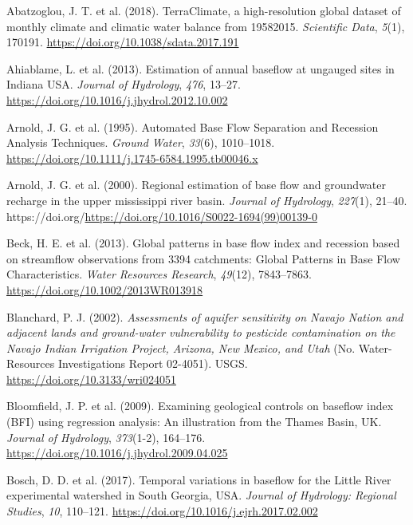 \documentclass[
]{agujournal2019}
\newlength{\cslhangindent}
\newenvironment{CSLReferences}[2] %
 {\begin{list}{}{%
  \setlength{\itemindent}{0pt}
  \setlength{\leftmargin}{0pt}
  \setlength{\parsep}{0pt}
  \ifodd #1
   \setlength{\leftmargin}{\cslhangindent}
   \setlength{\itemindent}{-1\cslhangindent}
  \fi
  \setlength{\itemsep}{#2\baselineskip}}}
 {\end{list}}
\begin{document}
\label{refs}
\begin{CSLReferences}{1}{0}
\vspace{1em}

Abatzoglou, J. T. et al. (2018). TerraClimate, a high-resolution global
dataset of monthly climate and climatic water balance from
1958{\textendash}2015. \emph{Scientific Data}, \emph{5}(1), 170191.
\url{https://doi.org/10.1038/sdata.2017.191}

Ahiablame, L. et al. (2013). Estimation of annual baseflow at ungauged
sites in Indiana USA. \emph{Journal of Hydrology}, \emph{476}, 13--27.
\url{https://doi.org/10.1016/j.jhydrol.2012.10.002}

Arnold, J. G. et al. (1995). Automated Base Flow Separation and
Recession Analysis Techniques. \emph{Ground Water}, \emph{33}(6),
1010--1018. \url{https://doi.org/10.1111/j.1745-6584.1995.tb00046.x}

Arnold, J. G. et al. (2000). Regional estimation of base flow and
groundwater recharge in the upper mississippi river basin. \emph{Journal
of Hydrology}, \emph{227}(1), 21--40.
https://doi.org/\url{https://doi.org/10.1016/S0022-1694(99)00139-0}

Beck, H. E. et al. (2013). Global patterns in base flow index and
recession based on streamflow observations from 3394 catchments: Global
Patterns in Base Flow Characteristics. \emph{Water Resources Research},
\emph{49}(12), 7843--7863. \url{https://doi.org/10.1002/2013WR013918}

Blanchard, P. J. (2002). \emph{Assessments of aquifer sensitivity on
{Navajo Nation} and adjacent lands and ground-water vulnerability to
pesticide contamination on the {Navajo Indian Irrigation Project},
{Arizona}, {New Mexico}, and {Utah}} (No. Water-Resources Investigations
Report 02-4051). {USGS}. \url{https://doi.org/10.3133/wri024051}

Bloomfield, J. P. et al. (2009). Examining geological controls on
baseflow index (BFI) using regression analysis: An illustration from the
Thames Basin, UK. \emph{Journal of Hydrology}, \emph{373}(1-2),
164--176. \url{https://doi.org/10.1016/j.jhydrol.2009.04.025}

Bosch, D. D. et al. (2017). Temporal variations in baseflow for the
Little River experimental watershed in South Georgia, USA. \emph{Journal
of Hydrology: Regional Studies}, \emph{10}, 110--121.
\url{https://doi.org/10.1016/j.ejrh.2017.02.002}


\end{CSLReferences}
\end{document}
